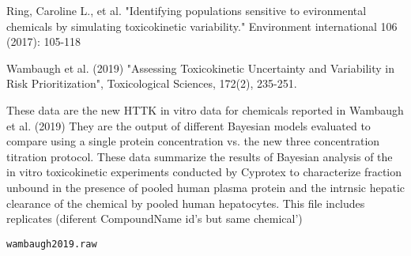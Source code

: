 \documentclass[a4paper]{book}
\begin{document}
%
\begin{References}\relax
Ring, Caroline L., et al. "Identifying populations sensitive to
evironmental chemicals by simulating toxicokinetic variability." Environment
international 106 (2017): 105-118

Wambaugh et al. (2019) "Assessing Toxicokinetic Uncertainty and
Variability in Risk Prioritization", Toxicological Sciences, 172(2), 235-251.
\end{References}
%
\begin{Description}\relax
These data are the new HTTK in vitro data for chemicals reported in Wambaugh
et al. (2019) They
are the output of different Bayesian models evaluated to compare using a
single protein concentration vs. the new three concentration titration
protocol. These data summarize the results of Bayesian analysis of the in vitro
toxicokinetic experiments conducted by Cyprotex to characterize fraction
unbound in the presence of pooled human plasma protein and the intrnsic
hepatic clearance of the chemical by pooled human hepatocytes.
This file includes replicates (diferent CompoundName id's but same chemical')
\end{Description}
%
\begin{Usage}
\begin{verbatim}
wambaugh2019.raw
\end{verbatim}
\end{Usage}
%
\end{document}
